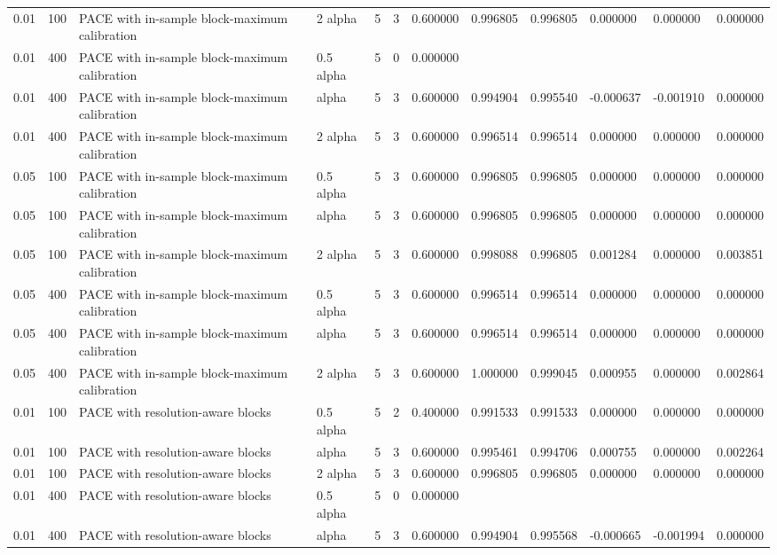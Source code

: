 \begin{tabular}{llllllllllll}
0.01 & 100 & PACE with in-sample block-maximum calibration & 2 alpha & 5 & 3 & 0.600000 & 0.996805 & 0.996805 & 0.000000 & 0.000000 & 0.000000 \\
0.01 & 400 & PACE with in-sample block-maximum calibration & 0.5 alpha & 5 & 0 & 0.000000 &  &  &  &  &  \\
0.01 & 400 & PACE with in-sample block-maximum calibration & alpha & 5 & 3 & 0.600000 & 0.994904 & 0.995540 & -0.000637 & -0.001910 & 0.000000 \\
0.01 & 400 & PACE with in-sample block-maximum calibration & 2 alpha & 5 & 3 & 0.600000 & 0.996514 & 0.996514 & 0.000000 & 0.000000 & 0.000000 \\
0.05 & 100 & PACE with in-sample block-maximum calibration & 0.5 alpha & 5 & 3 & 0.600000 & 0.996805 & 0.996805 & 0.000000 & 0.000000 & 0.000000 \\
0.05 & 100 & PACE with in-sample block-maximum calibration & alpha & 5 & 3 & 0.600000 & 0.996805 & 0.996805 & 0.000000 & 0.000000 & 0.000000 \\
0.05 & 100 & PACE with in-sample block-maximum calibration & 2 alpha & 5 & 3 & 0.600000 & 0.998088 & 0.996805 & 0.001284 & 0.000000 & 0.003851 \\
0.05 & 400 & PACE with in-sample block-maximum calibration & 0.5 alpha & 5 & 3 & 0.600000 & 0.996514 & 0.996514 & 0.000000 & 0.000000 & 0.000000 \\
0.05 & 400 & PACE with in-sample block-maximum calibration & alpha & 5 & 3 & 0.600000 & 0.996514 & 0.996514 & 0.000000 & 0.000000 & 0.000000 \\
0.05 & 400 & PACE with in-sample block-maximum calibration & 2 alpha & 5 & 3 & 0.600000 & 1.000000 & 0.999045 & 0.000955 & 0.000000 & 0.002864 \\
0.01 & 100 & PACE with resolution-aware blocks & 0.5 alpha & 5 & 2 & 0.400000 & 0.991533 & 0.991533 & 0.000000 & 0.000000 & 0.000000 \\
0.01 & 100 & PACE with resolution-aware blocks & alpha & 5 & 3 & 0.600000 & 0.995461 & 0.994706 & 0.000755 & 0.000000 & 0.002264 \\
0.01 & 100 & PACE with resolution-aware blocks & 2 alpha & 5 & 3 & 0.600000 & 0.996805 & 0.996805 & 0.000000 & 0.000000 & 0.000000 \\
0.01 & 400 & PACE with resolution-aware blocks & 0.5 alpha & 5 & 0 & 0.000000 &  &  &  &  &  \\
0.01 & 400 & PACE with resolution-aware blocks & alpha & 5 & 3 & 0.600000 & 0.994904 & 0.995568 & -0.000665 & -0.001994 & 0.000000 \\

\end{tabular}
